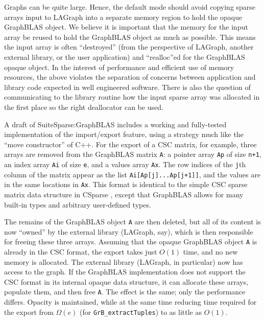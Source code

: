 Graphs can be quite large.   Hence, the default mode should avoid copying 
sparse arrays input to LAGraph into a separate memory region to hold the 
opaque GraphBLAS object.  We believe it is important that the memory for the input array
be reused to hold the GraphBLAS object as much as possible. 
This means the input array is often ``destroyed''
(from the perspective of LAGraph, another external library, or the user application)
and ``realloc''ed for the GraphBLAS opaque object.
In the interest of performance and efficient use of memory resources, 
the above violates the separation of concerns between application
and library code expected in well engineered software. 
There is also the question of communicating
to the library routine how the input sparse array was allocated in the first place so the right deallocator 
can be used.

A draft of SuiteSparse:GraphBLAS includes a working and fully-tested
implementation of the import/export feature, using a strategy much like the
``move constructor'' of C++.  For the export of a CSC matrix, for example,
three arrays are removed from the GraphBLAS matrix \verb'A': a pointer array
\verb'Ap' of size \verb'n+1', an index array \verb'Ai' of size \verb'e', and a
values array \verb'Ax'.  The row indices of the  \verb'j'th column of the
matrix appear as the list \verb'Ai[Ap[j]...Ap[j+1]]', and the values are in the
same locations in \verb'Ax'.  This format is identical to the simple CSC sparse
matrix data structure in CSparse \cite{Davis06book}, except that GraphBLAS
allows for many built-in types and arbitrary user-defined types.

The remains of the GraphBLAS object \verb'A' are then deleted, but all of its
content is now ``owned'' by the external library (LAGraph, say), which is then
responsible for freeing these three arrays.  Assuming that the opaque GraphBLAS
object \verb'A' is already in the CSC format, the export takes just $O(1)$
time, and no new memory is allocated.  The external library (LAGraph, in
particular) now has access to the graph.  If the GraphBLAS implementation does
not support the CSC format in its internal opaque data structure, it can
allocate these arrays, populate them, and then free \verb'A'.  The effect is
the same; only the performance differs.  Opacity is maintained, while at the
same time reducing time required for the export from $\Omega(e)$ (for
\verb'GrB_extractTuples') to as little as $O(1)$.

